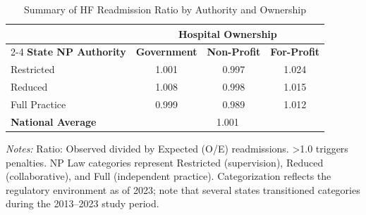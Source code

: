 \begin{table}[htbp]
    \centering
    \caption{Summary of HF Readmission Ratio by Authority and Ownership}
    \label{tab:rrp_excess_ratio_hf}
    \vspace{0.2cm}
    \begin{tabular}{lccc}
        \toprule
        & \multicolumn{3}{c}{\textbf{Hospital Ownership}} \\
        \cmidrule(lr){2-4}
        \textbf{State NP Authority} & \textbf{Government} & \textbf{Non-Profit} & \textbf{For-Profit} \\
        \midrule
        Restricted & 1.001 & 0.997 & 1.024 \\
        Reduced & 1.008 & 0.998 & 1.015 \\
        Full Practice & 0.999 & 0.989 & 1.012 \\
        \midrule
        \textbf{National Average} & \multicolumn{3}{c}{1.001} \\
        \bottomrule
    \end{tabular}
    \vspace{0.1cm}
    \begin{minipage}{0.85\textwidth}
        \footnotesize \textit{Notes:} Ratio: Observed divided by Expected (O/E) readmissions. >1.0 triggers penalties. NP Law categories represent Restricted (supervision), Reduced (collaborative), and Full (independent practice). Categorization reflects the regulatory environment as of 2023; note that several states transitioned categories during the 2013--2023 study period.
    \end{minipage}
\end{table}